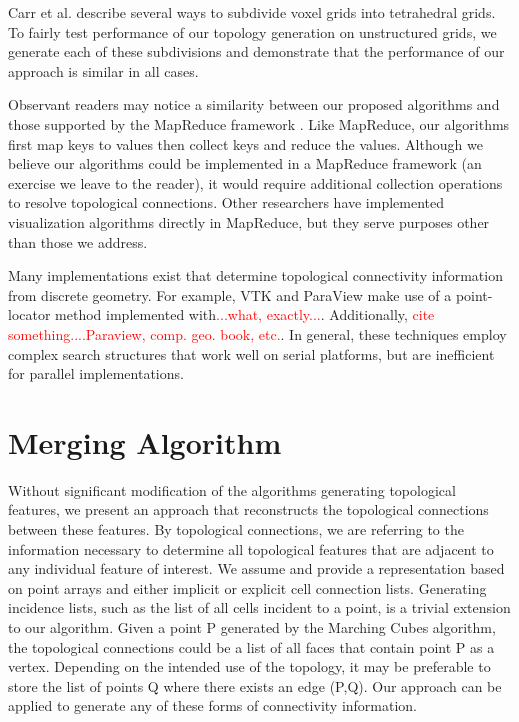 \documentclass[10pt,journal,cspaper,compsoc]{IEEEtran}
\begin{document}
Carr et al. \cite{Carr2006} describe several ways to subdivide voxel grids into tetrahedral grids. To fairly test performance of our topology generation on unstructured grids, we generate each of these subdivisions and demonstrate that the performance of our approach is similar in all cases.

Observant readers may notice a similarity between our proposed algorithms and those supported by the MapReduce framework \cite{MapReduce}. Like MapReduce, our algorithms first map keys to values then collect keys and reduce the values. Although we believe our algorithms could be implemented in a MapReduce framework (an exercise we leave to the reader), it would require additional collection operations to resolve topological connections. Other researchers 
\cite{Stuart2010}\cite{Vo2011} have implemented visualization algorithms directly in MapReduce, but they serve purposes other than those we address.

Many implementations exist that determine topological connectivity information from discrete geometry. For example, VTK and ParaView make use of a point-locator method implemented with\textcolor{red}{...what, exactly...}. Additionally, \textcolor{red}{cite something....Paraview, comp. geo. book, etc.}. In general, these techniques employ complex search structures that work well on serial platforms, but are inefficient for parallel implementations. 

\section{Merging Algorithm}
Without significant modification of the algorithms generating topological features,
we present an approach that reconstructs the topological connections
between these features. By topological connections, we are referring to the information necessary to
determine all topological features that are adjacent to any individual feature of 
interest. We assume and provide a representation based on point arrays and either implicit or explicit cell connection lists. Generating incidence lists, such as the list of all cells incident to a point, is a trivial extension to our algorithm. Given a point P 
generated by the Marching Cubes algorithm, the topological connections
could be a list of all faces that contain point P as a vertex. Depending on
the intended use of the topology, it may be preferable to store the list of
points Q where there exists an edge (P,Q). Our approach can be applied
to generate any of these forms of connectivity information.
\end{document}
